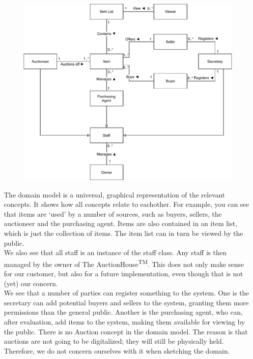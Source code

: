 \begin{figure}[H]
	\centering
	\includegraphics[scale=.9]{domainmodelUPD2.pdf}
\end{figure}

The domain model is a universal, graphical representation of the relevant concepts. It shows how all concepts relate to eachother. For example, you can see that items are `used' by a number of sources, such as buyers, sellers, the auctioneer and the purchasing agent. Items are also contained in an item list, which is just the collection of items. The item list can in turn be viewed by the public.\\
We also see that all staff is an instance of the staff class. Any staff is then managed by the owner of The AuctionHouse\textsuperscript{TM}. This does not only make sense for our customer, but also for a future implementation, even though that is not (yet) our concern.\\
We see that a number of parties can register something to the system. One is the secretary can add potential buyers and sellers to the system, granting them more permissions than the general public. Another is the purchasing agent, who can, after evaluation, add items to the system, making them available for viewing by the public.
There is no Auction concept in the domain model. The reason is that auctions are not going to be digitalized; they will still be physically held. Therefore, we do not concern ourselves with it when sketching the domain.